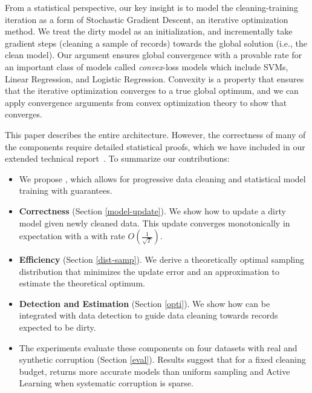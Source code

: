 From a statistical perspective, our key insight is to model the cleaning-training iteration as a form of Stochastic Gradient Descent, an iterative optimization method.
We treat the dirty model as an initialization, and incrementally take gradient steps (cleaning a sample of records) towards the global solution (i.e., the clean model).
Our argument ensures global convergence with a provable rate for an important class of models called \emph{convex}-loss models which include SVMs, Linear Regression, and Logistic Regression.
Convexity is a property that ensures that the iterative optimization converges to a true global optimum, and we can apply convergence arguments from convex optimization theory to show that \sys converges.

This paper describes the entire \sys architecture. However, the correctness of many of the components require detailed statistical proofs, which we have included in our extended technical report~\cite{activecleanarxiv}. To summarize our contributions:
\begin{itemize}[noitemsep]
\item We propose \sys, which allows for progressive data cleaning and statistical model training with guarantees.
\item \textbf{Correctness} (Section \ref{model-update}). We show how to update a dirty model given newly cleaned data. This update converges monotonically in expectation with a with rate $O(\frac{1}{\sqrt{T}})$.
\item \textbf{Efficiency} (Section \ref{dist-samp}). We derive a theoretically optimal sampling distribution that minimizes the update error and an approximation to estimate the theoretical optimum. 
\item \textbf{Detection and Estimation} (Section \ref{opti}). We show how \sys can be integrated with data detection to guide data cleaning towards records expected to be dirty.
\item The experiments evaluate these components on four datasets with real and synthetic corruption (Section \ref{eval}). Results suggest that for a fixed cleaning budget, \sys returns more accurate models than uniform sampling and Active Learning when systematic corruption is sparse.

\end{itemize}






